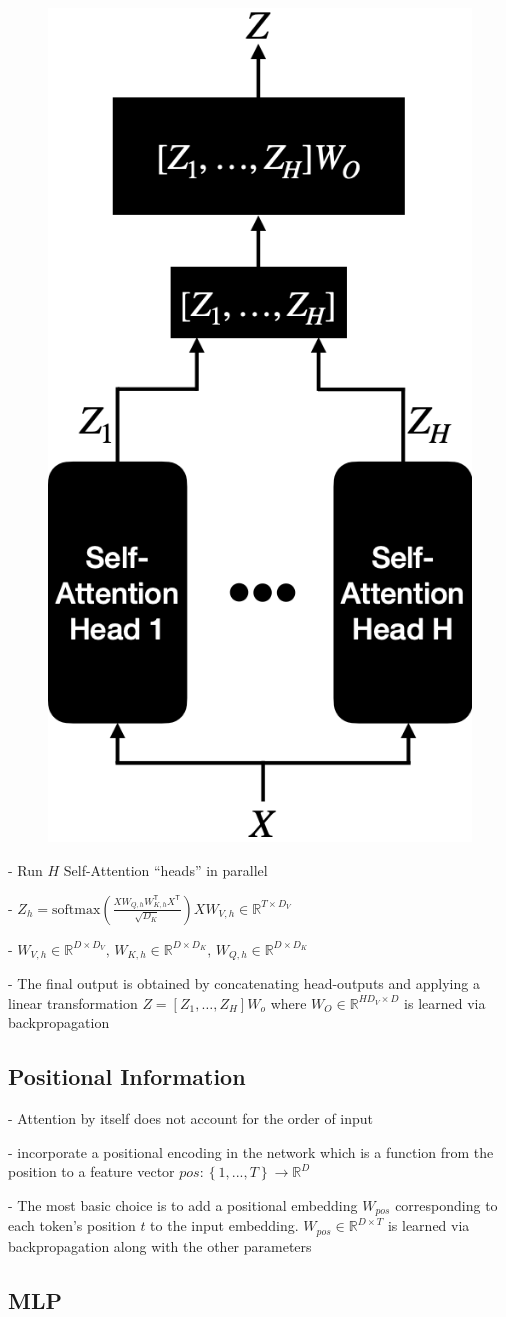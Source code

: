 \begin{figure} 
  \centering
  \includegraphics[width=0.3\columnwidth]{figures/multi_head.png}
\end{figure}

- Run $H$ Self-Attention “heads” in parallel

- $Z_{h}={\mathrm{softmax}}\left({\frac{X W_{Q,h}W_{K,h}^{\mathsf{T}}X^{\mathsf{T}}}{\sqrt{D_{K}}}}\right)X W_{V,h}\in\mathbb{R}^{T\times D_{V}}$ 


- $W_{V,h}\in\mathbb{R}^{D\times D_{V}},\,W_{K,h}\in\mathbb{R}^{D\times D_{K}},\,W_{Q,h}\in\mathbb{R}^{D\times D_{K}}$

- The final output is obtained by concatenating head-outputs and applying a linear transformation $Z=[Z_{1},\dots,Z_{H}]W_{o}$ where $W_{O}\in\mathbb{R}^{H D_{V}\times D}$ is learned via backpropagation

\subsection*{Positional Information}

- Attention by itself does not account for the order of input

- incorporate a positional encoding in the network which is a function from the position to a feature vector $p o s:\left\{1,...,T\right\}\rightarrow\mathbb{R}^{D}$

- The most basic choice is to add a positional embedding $W_{p o s}$ corresponding to each token's position $t$ to the input embedding. $W_{p o s}\in\mathbb{R}^{D\times T}$ is learned via backpropagation along with the other parameters

\subsection*{MLP}

